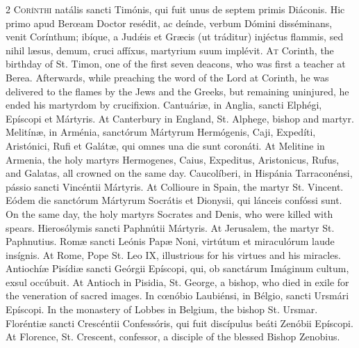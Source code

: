 \begin{paracol}{2}
\lettrine[lines=2]{C}{orínthi} natális 
 sancti Timónis, qui fuit unus de septem primis Diáconis. Hic primo 
 apud Berœam Doctor resédit, ac deínde, verbum Dómini disséminans, venit 
 Corínthum; ibíque, a Judǽis et Græcis (ut tráditur) injéctus flammis, sed 
 nihil læsus, demum, cruci affíxus, martyrium suum implévit.
\switchcolumn
{}
\lettrine[lines=2]{A}{t} Corinth, the birthday of St. 
 Timon, one of the first seven deacons, who was first a teacher at Berea. 
 Afterwards, while preaching the word of the Lord at Corinth, he was 
 delivered to the flames by the Jews and the Greeks, but remaining uninjured, 
 he ended his martyrdom by crucifixion.
\switchcolumn*
{}
Cantuáriæ, in Anglia, 
 sancti Elphégi, Epíscopi et Mártyris.
\switchcolumn
{}
At Canterbury in England, St. 
 Alphege, bishop and martyr.
\switchcolumn*
{}
Melitínæ, in Arménia, sanctórum Mártyrum Hermógenis, Caji, Expedíti, Aristónici, Rufi et Galátæ, 
 qui omnes una die sunt coronáti.
\switchcolumn
{}
At Melitine in Armenia, the holy 
 martyrs Hermogenes, Caius, Expeditus, Aristonicus, Rufus, and Galatas, all 
 crowned on the same day.
\switchcolumn*
{}
Caucolíberi, in 
 Hispánia Tarraconénsi, pássio sancti Vincéntii Mártyris.
\switchcolumn
{}
At Collioure in Spain, the martyr 
 St. Vincent.
\switchcolumn*
{}
Eódem die sanctórum 
 Mártyrum Socrátis et Dionysii, qui lánceis confóssi sunt.
\switchcolumn
{}
On the same day, the holy martyrs 
 Socrates and Denis, who were killed with spears.
\switchcolumn*
{}
Hierosólymis sancti 
 Paphnútii Mártyris.
\switchcolumn
{}
At Jerusalem, the martyr St. 
 Paphnutius.
\switchcolumn*
{}
Romæ sancti Leónis 
 Papæ Noni, virtútum et miraculórum laude insígnis.
\switchcolumn
{}
At Rome, Pope St. Leo IX, 
 illustrious for his virtues and his miracles.
\switchcolumn*
{}
Antiochíæ Pisídiæ 
 sancti Geórgii Epíscopi, qui, ob sanctárum Imáginum cultum, exsul occúbuit.
\switchcolumn
{}
At Antioch in Pisidia, St. George, 
 a bishop, who died in exile for the veneration of sacred images.
\switchcolumn*
{}
In cœnóbio Laubiénsi, 
 in Bélgio, sancti Ursmári Epíscopi.
\switchcolumn
{}
In the monastery of Lobbes in Belgium, the 
 bishop St. Ursmar.
\switchcolumn*
{}
Floréntiæ sancti 
 Crescéntii Confessóris, qui fuit discípulus beáti Zenóbii Epíscopi.
\switchcolumn
{}
At Florence, St. Crescent, 
 confessor, a disciple of the blessed Bishop Zenobius.
\switchcolumn*
{}
\end{paracol}


